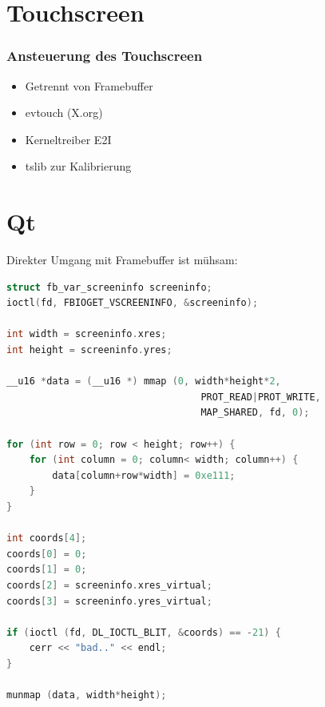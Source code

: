 \documentclass{beamer}
\begin{document}
	\section{Touchscreen}
	
	\begin{frame}
		\frametitle{Ansteuerung des Touchscreen}
		\begin{itemize}
			\item Getrennt von Framebuffer
			\item evtouch (X.org)
			\item Kerneltreiber E2I
			\item tslib zur Kalibrierung
		\end{itemize}
	\end{frame}	
	
	\section{Qt}
	
	\begin{frame}[containsverbatim]
		Direkter Umgang mit Framebuffer ist mühsam:
		\begin{lstlisting}[language=C, basicstyle=\scriptsize]
struct fb_var_screeninfo screeninfo;
ioctl(fd, FBIOGET_VSCREENINFO, &screeninfo);

int width = screeninfo.xres;
int height = screeninfo.yres;

__u16 *data = (__u16 *) mmap (0, width*height*2,
                                  PROT_READ|PROT_WRITE,
                                  MAP_SHARED, fd, 0);

for (int row = 0; row < height; row++) {
    for (int column = 0; column< width; column++) {
        data[column+row*width] = 0xe111;
    }
}

int coords[4];
coords[0] = 0;
coords[1] = 0;
coords[2] = screeninfo.xres_virtual;
coords[3] = screeninfo.yres_virtual;

if (ioctl (fd, DL_IOCTL_BLIT, &coords) == -21) {
    cerr << "bad.." << endl;
}

munmap (data, width*height);
		\end{lstlisting}
	\end{frame}	
	
\end{document}
